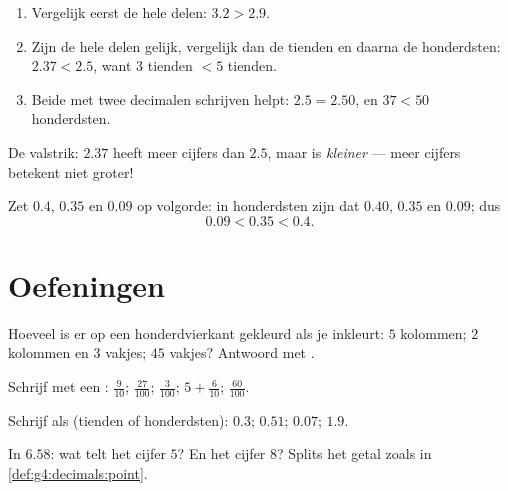 \begin{method}\label{met:g4:decimals:compare}
\begin{enumerate}
  \item Vergelijk eerst de hele delen: $3.2 > 2.9$.
  \item Zijn de hele delen gelijk, vergelijk dan de tienden en daarna de
        honderdsten: $2.37 < 2.5$, want $3$ tienden $< 5$ tienden.
  \item Beide met twee decimalen schrijven helpt: $2.5 = 2.50$, en
        $37 < 50$ honderdsten.
\end{enumerate}
De valstrik: $2.37$ heeft meer cijfers dan $2.5$, maar is \emph{kleiner}
--- meer cijfers betekent niet groter!
\end{method}

\begin{example}\label{ex:g4:decimals:compare}
Zet $0.4$, $0.35$ en $0.09$ op volgorde: in honderdsten zijn dat $0.40$,
$0.35$ en $0.09$; dus
\[
0.09 < 0.35 < 0.4 .
\]
\end{example}

\section{Oefeningen}

\begin{exercise}[$\star$]\label{exo:g4:decimals:1}
Hoeveel is er op een honderdvierkant gekleurd als je inkleurt: $5$
kolommen; $2$ kolommen en $3$ vakjes; $45$ vakjes? Antwoord met .
\end{exercise}

\begin{exercise}[$\star$]\label{exo:g4:decimals:2}
Schrijf met een :
$\frac{9}{10}$; \quad $\frac{27}{100}$; \quad $\frac{3}{100}$; \quad
$5 + \frac{6}{10}$; \quad $\frac{60}{100}$.
\end{exercise}

\begin{exercise}[$\star$]\label{exo:g4:decimals:3}
Schrijf als  (tienden of honderdsten):
$0.3$; \quad $0.51$; \quad $0.07$; \quad $1.9$.
\end{exercise}

\begin{exercise}[$\star$]\label{exo:g4:decimals:4}
In $6.58$: wat telt het cijfer $5$? En het cijfer $8$? Splits het getal
zoals in \cref{def:g4:decimals:point}.
\end{exercise}

